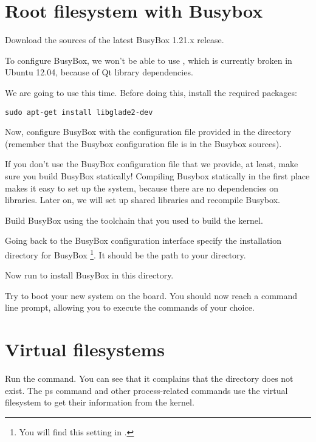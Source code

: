 \section{Root filesystem with Busybox}

Download the sources of the latest BusyBox 1.21.x release.

To configure BusyBox, we won't be able to use ,
which is currently broken in Ubuntu 12.04, because of Qt library
dependencies.

We are going to use  this time. Before doing this,
install the required packages:

\begin{verbatim}
sudo apt-get install libglade2-dev
\end{verbatim}

Now, configure BusyBox with the configuration file provided in the
 directory (remember that the Busybox configuration file
is  in the Busybox sources).

If you don't use the BusyBox configuration file that we provide, at least,
make sure you build BusyBox statically! Compiling Busybox
statically in the first place makes it easy to set up the system,
because there are no dependencies on libraries. Later on, we will set
up shared libraries and recompile Busybox.

Build BusyBox using the toolchain that you used to build the kernel.

Going back to the BusyBox configuration interface
specify the installation directory for BusyBox
\footnote{You will find this setting in
.}.
It should be the path to your  directory.

Now run  to install BusyBox in this directory.

Try to boot your new system on the board. You should now reach a 
command line prompt, allowing you to execute the commands of your
choice.

\section{Virtual filesystems}

Run the  command. You can see that it complains that the
 directory does not exist. The ps command and other
process-related commands use the  virtual filesystem to get
their information from the kernel.

